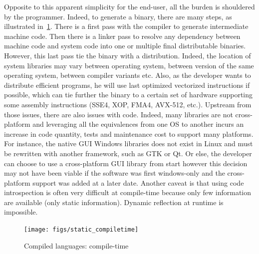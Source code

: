 Opposite to this apparent simplicity for the end-user, all the burden is shouldered by the programmer. Indeed, to
generate a binary, there are many steps, as illustrated in~\cref{fig:static.dynamic.compiled.compiletime}. There is a
first pass with the compiler to generate intermediate machine code. Then there is a linker pass to resolve any
dependency between machine code and system code into one or multiple final distributable binaries. However, this last
pass tie the binary with a distribution. Indeed, the location of system libraries may vary between operating system,
between version of the same operating system, between compiler variants etc. Also, as the developer wants to distribute
efficient programs, he will use last optimized vectorized instructions if possible, which can tie further the binary to
a certain set of hardware supporting some assembly instructions (SSE4, XOP, FMA4, AVX-512, etc.). Upstream from those
issues, there are also issues with code. Indeed, many libraries are not cross-platform and leveraging all the
equivalences from one OS to another incurs an increase in code quantity, tests and maintenance cost to support many
platforms. For instance, the native GUI Windows libraries does not exist in Linux and must be rewritten with another
framework, such as GTK or Qt. Or else, the developer can choose to use a cross-platform GUI library from start however
this decision may not have been viable if the software was first windows-only and the cross-platform support was added
at a later date. Another caveat is that using code introspection is often very difficult at compile-time because only
few information are available (only static information). Dynamic reflection at runtime is impossible.

\begin{figure}[tbh]
  \centering
  \texttt{[image: figs/static\_compiletime]}
  \caption{Compiled languages: compile-time}
  \label{fig:static.dynamic.compiled.compiletime}
\end{figure}

